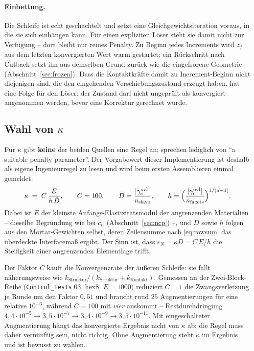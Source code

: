 \documentclass[a4paper,11pt]{article}
\newcommand{\file}[1]{\texttt{\small #1}}
\begin{document}
\paragraph{Einbettung.} Die Schleife ist echt geschachtelt und setzt eine Gleichgewichtsiteration
voraus, in die sie sich einhängen kann. Für einen expliziten Löser steht sie damit nicht zur
Verfügung -- dort bleibt nur reines Penalty. Zu Beginn jedes Increments wird $z_j$ aus dem letzten
konvergierten Wert warm gestartet; ein Rückschritt nach Cutback setzt ihn aus demselben Grund
zurück wie die eingefrorene Geometrie (Abschnitt~\ref{sec:frozen}). Dass die Kontaktkräfte damit
zu Increment-Beginn nicht diejenigen sind, die den eingehenden Verschiebungszustand erzeugt haben,
hat eine Folge für den Löser: der Zustand darf nicht ungeprüft als konvergiert angenommen werden,
bevor eine Korrektur gerechnet wurde.

\subsection{Wahl von $\kappa$}
\label{sec:kappachoice}

Für $\kappa$ gibt \textbf{keine} der beiden Quellen eine Regel an; \citet{puso2008} sprechen
lediglich von ``a suitable penalty parameter''. Der Vorgabewert dieser Implementierung ist deshalb
als eigene Ingenieurregel zu lesen und wird beim ersten Assemblieren einmal gemeldet:
\begin{equation}
\kappa \;=\; C\,\frac{E}{h\,\bar D},
\qquad C=100,
\qquad \bar D=\frac{|\gamma_c^{\text{ovl}}|}{n_{\text{slave}}},
\qquad h=\Bigl(\frac{|\gamma_c^{\text{ovl}}|}{n_{\text{facets}}}\Bigr)^{1/(d-1)} .
\label{eq:kappadefault}
\end{equation}
Dabei ist $E$ der kleinste Anfangs-Elastizitätsmodul der angrenzenden Materialien -- dieselbe
Begründung wie bei $c_n$ (Abschnitt~\ref{sec:ncp}) --, und $\bar D$ sowie $h$ folgen aus den
Mortar-Gewichten selbst, deren Zeilensumme nach \eqref{eq:rowsum} das überdeckte Interfacemaß
ergibt. Der Sinn ist, dass $\varepsilon_N=\kappa\bar D=C\,E/h$ die Steifigkeit einer angrenzenden
Elementlage trifft.

Der Faktor $C$ kauft die Konvergenzrate der äußeren Schleife: sie fällt näherungsweise wie
$k_{\text{Struktur}}/(k_{\text{Struktur}}+k_{\text{Kontakt}})$. Gemessen an der Zwei-Block-Reihe
(\file{Control\_Tests} 03, hex8, $E=1000$) reduziert $C=1$ die Zwangsverletzung je Runde um den
Faktor $0{,}51$ und braucht rund $25$ Augmentierungen für eine relative $10^{-6}$, während $C=100$
mit \emph{vier} auskommt -- Restdurchdringung $4{,}4\cdot10^{-5}\to3{,}5\cdot10^{-7}\to
3{,}4\cdot10^{-9}\to3{,}5\cdot10^{-11}$. Mit eingeschalteter Augmentierung hängt das konvergierte
Ergebnis nicht von $\kappa$ ab; die Regel muss daher vernünftig sein, nicht richtig. Ohne
Augmentierung steht $\kappa$ im Ergebnis und ist bewusst zu wählen.
\end{document}
